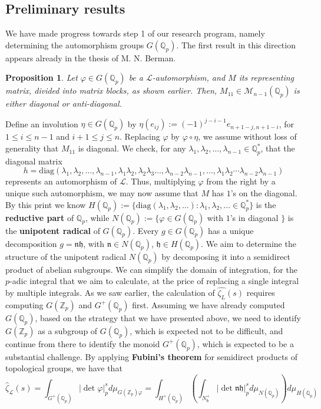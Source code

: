 \documentclass[12pt]{article}
\newtheorem{proposition}[theorem]{Proposition}
\begin{document}
\subsection{Preliminary results}
\label{preliminary.results}
We have made progress towards step 1 of our research program, namely determining the automorphism groups $G(\mathbb{Q}_p)$.
The first result in this direction appears already in the thesis of M. N. Berman\cite[Prop. 3.6]{Berman}.
\begin{proposition}
Let $\varphi\in{G(\mathbb{Q}_p)}$ be a $\mathcal{L}$-automorphism, and $M$ its representing matrix, divided into matrix blocks, as shown earlier. Then, $M_{11}\in\mathcal{M}_{n-1}(\mathbb{Q}_p)$ is either diagonal or anti-diagonal.
\end{proposition}
Define an involution $\eta\in{G(\mathbb{Q}_p)}$ by $\eta(e_{ij}):=(-1)^{j-i-1}e_{n+1-j,n+1-i}$, for $1\leq{i}\leq{n-1}$ and ${i+1}\leq{j}\leq{n}$. Replacing $\varphi$ by $\varphi\circ\eta$, we assume without loss of generality that $M_{11}$ is diagonal.
We check, for any $\lambda_{1},\lambda_{2},\dots,\lambda_{n-1}\in\mathbb{Q}_{p}^{\ast}$, that the diagonal matrix \[h=\mathrm{diag}(\lambda_{1},\lambda_{2},\dots,\lambda_{n-1},\lambda_{1}\lambda_{2},\lambda_{2}\lambda_{3}\dots,\lambda_{n-2}\lambda_{n-1},\dots,\lambda_{1}\lambda_{2}\cdots\lambda_{n-2}\lambda_{n-1})\]
represents an automorphism of $\mathcal{L}$. Thus, multiplying $\varphi$ from the right by a unique such automorphism, we may now assume that $M$ has $1$'s on the diagonal. By this print we know
$H(\mathbb{Q}_{p}):=\{\mathrm{diag}(\lambda_{1},\lambda_{2},\dots) : \lambda_{1},\lambda_{2},\dots\in\mathbb{Q}_{p}^{\ast}\}$ is the \textbf{reductive part} of $\mathbb{Q}_{p}$, while $N(\mathbb{Q}_{p}):=\{\varphi\in{G(\mathbb{Q}_{p})}$ with $1$'s
 in diagonal $\}$ is the \textbf{unipotent radical} of $G(\mathbb{Q}_{p})$.
Every $g\in{G(\mathbb{Q}_{p})}$ has a unique decomposition $g=\mathfrak{n}\mathfrak{h}$, with $\mathfrak{n}\in{N}(\mathbb{Q}_{p})$, $\mathfrak{h}\in{H(\mathbb{Q}_{p})}$. We aim to determine the structure of the unipotent radical $N(\mathbb{Q}_p)$ by decomposing it into a semidirect product of abelian subgroups. 
We can simplify the domain of integration, for the $p$-adic integral that we aim to calculate, at the price of replacing a single integral by multiple integrals. As we saw earlier, the calculation of $\hat{\zeta_{L}}(s)$ requires computing $G(\mathbb{Z}_p)$ and $G^+(\mathbb{Q}_p)$ first. Assuming we have already computed $G(\mathbb{Q}_p)$, based on the strategy that we have presented above, we need to identify $G(\mathbb{Z}_p)$ as a subgroup of $G(\mathbb{Q}_p)$, which is expected not to be difficult, and continue from there to identify the monoid $G^+(\mathbb{Q}_p)$, which is expected to be a substantial challenge. By applying \textbf{Fubini's theorem} for semidirect products of topological groups, we have that \[\hat\zeta_{\mathcal{L}}(s)=\displaystyle\int_{G^+(\mathbb{Q}_p)}|\det\varphi|_p^sd\mu_{G(\mathbb{Z}_p)\varphi}=\displaystyle\int_{H^+(\mathbb{Q}_p)}\left(\displaystyle\int_{N_{\mathfrak{h}}^+}|\det\mathfrak{n}\mathfrak{h}|_p^sd\mu_{N(\mathbb{Q}_p)}\right)d\mu_{H(\mathbb{Q}_p)}\]
\end{document}
